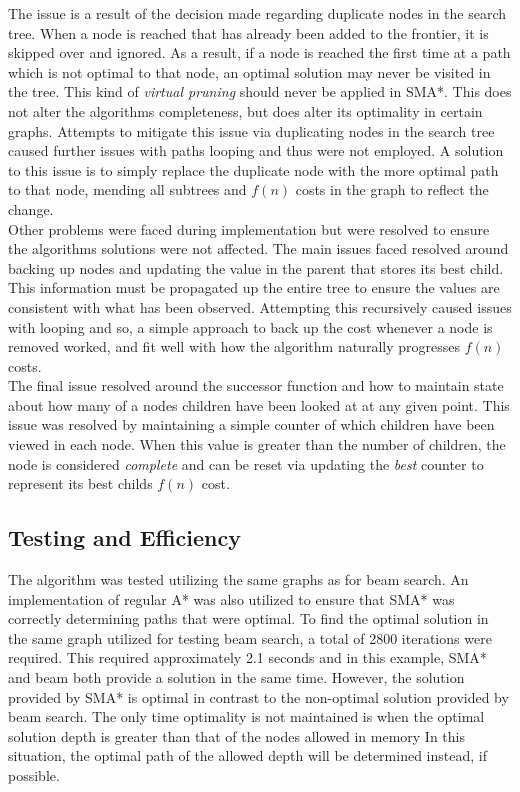 \documentclass[]{article}
\begin{document}
The issue is a result of the decision made regarding duplicate nodes in the search tree. When a node is reached that has already been added to the frontier, it is skipped over and ignored. As a result, if a node is reached the first time at a path which is not optimal to that node, an optimal solution may never be visited in the tree. This kind of \textit{virtual pruning} should never be applied in SMA*. This does not alter the algorithms completeness, but does alter its optimality in certain graphs. Attempts to mitigate this issue via duplicating nodes in the search tree caused further issues with paths looping and thus were not employed. A solution to this issue is to simply replace the duplicate node with the more optimal path to that node, mending all subtrees and $f(n)$ costs in the graph to reflect the change.\\

Other problems were faced during implementation but were resolved to ensure the algorithms solutions were not affected. The main issues faced resolved around backing up nodes and updating the value in the parent that stores its best child. This information must be propagated up the entire tree to ensure the values are consistent with what has been observed. Attempting this recursively caused issues with looping and so, a simple approach to back up the cost whenever a node is removed worked, and fit well with how the algorithm naturally progresses $f(n)$ costs.\\

The final issue resolved around the successor function and how to maintain state about how many of a nodes children have been looked at at any given point. This issue was resolved by maintaining a simple counter of which children have been viewed in each node. When this value is greater than the number of children, the node is considered \textit{complete} and can be reset via updating the \textit{best} counter to represent its best childs $f(n)$ cost.

\subsection*{Testing and Efficiency}

The algorithm was tested utilizing the same graphs as for beam search. An implementation of regular A* was also utilized to ensure that SMA* was correctly determining paths that were optimal. To find the optimal solution in the same graph utilized for testing beam search, a total of 2800 iterations were required. This required approximately 2.1 seconds and in this example, SMA* and beam both provide a solution in the same time. However, the solution provided by SMA* is optimal in contrast to the non-optimal solution provided by beam search. The only time optimality is not maintained is when the optimal solution depth is greater than that of the nodes allowed in memory In this situation, the optimal path of the allowed depth will be determined instead, if possible.


\break
\setlength{}
\printbibliography[title={References}]

\end{document}
